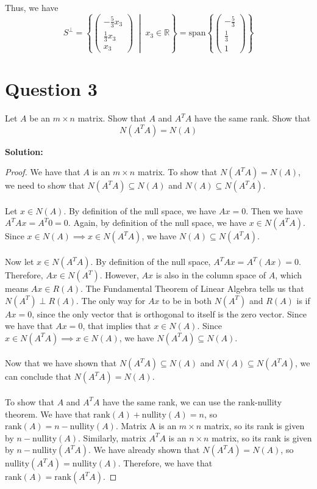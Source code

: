 \documentclass{article}
\begin{document}
Thus, we have
$$ S^\perp = \left\{
    \begin{pmatrix} -\frac{5}{3}x_3 \\ \frac{1}{3}x_3 \\ x_3 \end{pmatrix} 
    \; \middle| \; 
    x_3 \in \mathbb{R}
\right\} = \text{span} \left\{
    \begin{pmatrix} -\frac{5}{3} \\ \frac{1}{3} \\ 1 \end{pmatrix}
\right\} $$

\newpage
\section*{Question 3}
Let $A$ be an $m \times n$ matrix.
Show that $A$ and $A^TA$ have the same rank.
Show that $$ N(A^T A) = N(A) $$

\vspace{0.5cm}
\noindent\textbf{Solution:}
\begin{proof}
    We have that $A$ is an $m \times n$ matrix.
    To show that $N(A^T A) = N(A)$, we need to show that $N(A^T A) \subseteq N(A)$ and $N(A) \subseteq N(A^T A)$.
    \\ \\
    Let $x \in N(A)$.
    By definition of the null space, we have $Ax = 0$.
    Then we have $A^T A x = A^T 0 = 0$.
    Again, by definition of the null space, we have $x \in N(A^T A)$.
    Since $x \in N(A) \implies x \in N(A^T A)$, we have $N(A) \subseteq N(A^T A)$.
    \\ \\
    Now let $x \in N(A^T A)$.
    By definition of the null space, $A^T A x = A^T (A x) = 0$.
    Therefore, $Ax \in N(A^T)$.
    However, $Ax$ is also in the column space of $A$, which means $Ax \in R(A)$.
    The Fundamental Theorem of Linear Algebra tells us that $N(A^T) \perp R(A)$.
    The only way for $Ax$ to be in both $N(A^T)$ and $R(A)$ is if $Ax = 0$,
    since the only vector that is orthogonal to itself is the zero vector.
    Since we have that $Ax=0$, that implies that $x \in N(A)$.
    Since $x \in N(A^T A) \implies x \in N(A)$, we have $N(A^T A) \subseteq N(A)$.
    \\ \\
    Now that we have shown that $N(A^T A) \subseteq N(A)$ and $N(A) \subseteq N(A^T A)$,
    we can conclude that $N(A^T A) = N(A)$.
    \\ \\
    To show that $A$ and $A^T A$ have the same rank, we can use the rank-nullity theorem.
    We have that $\text{rank}(A) + \text{nullity}(A) = n$, so $\text{rank}(A) = n - \text{nullity}(A)$.
    Matrix A is an $m \times n$ matrix, so its rank is given by $n - \text{nullity}(A)$.
    Similarly, matrix $A^T A$ is an $n \times n$ matrix, so its rank is given by $n - \text{nullity}(A^T A)$.
    We have already shown that $N(A^T A) = N(A)$, so $\text{nullity}(A^T A) = \text{nullity}(A)$.
    Therefore, we have that $\text{rank}(A) = \text{rank}(A^T A)$.
\end{proof}
\end{document}

